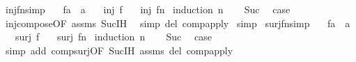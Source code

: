 \begin{isabellebody}
{\isafoldproof}%
%
\isadelimproof
\isanewline
%
\endisadelimproof
\isanewline
{}\isamarkupfalse%
\ inj{\isacharunderscore}{\kern0pt}fn{\isacharbrackleft}{\kern0pt}simp{\isacharbrackright}{\kern0pt}{\isacharcolon}{\kern0pt}\isanewline
\ \ \ f{\isacharcolon}{\kern0pt}{\isacharcolon}{\kern0pt}{\isachardoublequoteopen}{\isacharprime}{\kern0pt}a\ {\isasymRightarrow}\ {\isacharprime}{\kern0pt}a{\isachardoublequoteclose}\isanewline
\ \ \ {\isachardoublequoteopen}inj\ f{\isachardoublequoteclose}\isanewline
\ \ \ {\isachardoublequoteopen}inj\ {\isacharparenleft}{\kern0pt}f{\isacharcircum}{\kern0pt}{\isacharcircum}{\kern0pt}n{\isacharparenright}{\kern0pt}{\isachardoublequoteclose}\isanewline
%
\isadelimproof
%
\endisadelimproof
%
\isatagproof
{}\isamarkupfalse%
\ {\isacharparenleft}{\kern0pt}induction\ n{\isacharparenright}{\kern0pt}\isanewline
\ \ \isamarkupfalse%
\ Suc\ \isamarkupfalse%
\ {\isacharquery}{\kern0pt}case\ \isamarkupfalse%
\ inj{\isacharunderscore}{\kern0pt}compose{\isacharbrackleft}{\kern0pt}OF\ assms\ Suc{\isachardot}{\kern0pt}IH{\isacharbrackright}{\kern0pt}\ \isamarkupfalse%
\ {\isacharparenleft}{\kern0pt}simp\ del{\isacharcolon}{\kern0pt}\ comp{\isacharunderscore}{\kern0pt}apply{\isacharparenright}{\kern0pt}\isanewline
{}\isamarkupfalse%
\ simp%
\endisatagproof
{\isafoldproof}%
%
\isadelimproof
\isanewline
%
\endisadelimproof
\isanewline
{}\isamarkupfalse%
\ surj{\isacharunderscore}{\kern0pt}fn{\isacharbrackleft}{\kern0pt}simp{\isacharbrackright}{\kern0pt}{\isacharcolon}{\kern0pt}\isanewline
\ \ \ f{\isacharcolon}{\kern0pt}{\isacharcolon}{\kern0pt}{\isachardoublequoteopen}{\isacharprime}{\kern0pt}a\ {\isasymRightarrow}\ {\isacharprime}{\kern0pt}a{\isachardoublequoteclose}\isanewline
\ \ \ {\isachardoublequoteopen}surj\ f{\isachardoublequoteclose}\isanewline
\ \ \ {\isachardoublequoteopen}surj\ {\isacharparenleft}{\kern0pt}f{\isacharcircum}{\kern0pt}{\isacharcircum}{\kern0pt}n{\isacharparenright}{\kern0pt}{\isachardoublequoteclose}\isanewline
%
\isadelimproof
%
\endisadelimproof
%
\isatagproof
{}\isamarkupfalse%
\ {\isacharparenleft}{\kern0pt}induction\ n{\isacharparenright}{\kern0pt}\isanewline
\ \ \isamarkupfalse%
\ Suc\ \isamarkupfalse%
\ {\isacharquery}{\kern0pt}case\ \isamarkupfalse%
\ {\isacharparenleft}{\kern0pt}simp\ add{\isacharcolon}{\kern0pt}\ comp{\isacharunderscore}{\kern0pt}surj{\isacharbrackleft}{\kern0pt}OF\ Suc{\isachardot}{\kern0pt}IH\ assms{\isacharbrackright}{\kern0pt}\ del{\isacharcolon}{\kern0pt}\ comp{\isacharunderscore}{\kern0pt}apply{\isacharparenright}{\kern0pt}\isanewline

\end{isabellebody}
